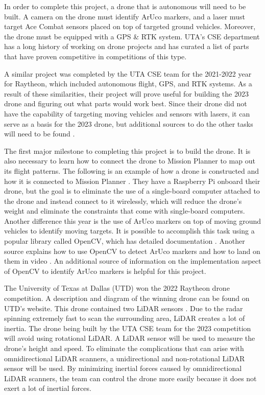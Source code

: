 
In order to complete this project, a drone that is autonomous will need to be built. A camera on the drone must identify ArUco markers, and a laser must target Ace Combat sensors placed on top of targeted ground vehicles. Moreover, the drone must be equipped with a GPS \& RTK system. UTA's CSE department has a long history of working on drone projects and has curated a list of parts that have proven competitive in competitions of this type.

A similar project was completed by the UTA CSE team for the 2021-2022 year for Raytheon, which included autonomous flight, GPS, and RTK systems. As a result of these similarities, their project will prove useful for building the 2023 drone and figuring out what parts would work best. Since their drone did not have the capability of targeting moving vehicles and sensors with lasers, it can serve as a basis for the 2023 drone, but additional sources to do the other tasks will need to be found \cite{Lotspeich}.

The first major milestone to completing this project is to build the drone. It is also necessary to learn how to connect the drone to Mission Planner to map out its flight patterns. The following is an example of how a drone is constructed and how it is connected to Mission Planner \cite{UoBDASAR}. They have a Raspberry Pi onboard their drone, but the goal is to eliminate the use of a single-board computer attached to the drone and instead connect to it wirelessly, which will reduce the drone's weight and eliminate the constraints that come with single-board computers. Another difference this year is the use of ArUco markers on top of moving ground vehicles to identify moving targets. It is possible to accomplish this task using a popular library called OpenCV, which has detailed documentation \cite{Bradsky}. Another source explains how to use OpenCV to detect ArUco markers and how to land on them in video \cite{Fiorenzani}. An additional source of information on the implementation aspect of OpenCV to identify ArUco markers is helpful for this project.

The University of Texas at Dallas (UTD) won the 2022 Raytheon drone competition. A description and diagram of the winning drone can be found on UTD's website. This drone contained two LiDAR sensors \cite{Posamentier}. Due to the radar spinning extremely fast to scan the surrounding area, LiDAR creates a lot of inertia. The drone being built by the UTA CSE team for the 2023 competition will avoid using rotational LiDAR. A LiDAR sensor will be used to measure the drone's height and speed. To eliminate the complications that can arise with omnidirectional LiDAR scanners, a unidirectional and non-rotational LiDAR sensor will be used. By minimizing inertial forces caused by omnidirectional LiDAR scanners, the team can control the drone more easily because it does not exert a lot of inertial forces.
